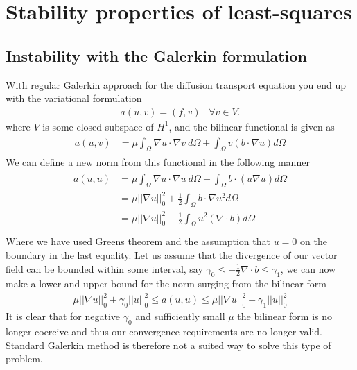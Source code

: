 
\chapter{Stability properties of least-squares} %

\label{chap:newTheory} %


\section{Instability with the Galerkin formulation}

With regular Galerkin approach for the diffusion transport equation you end up with the variational formulation 
%
\begin{align}
	a(u,v) = (f,v) \; \; \; \forall v \in V.
	\label{eq:varFormDiffFEM}
\end{align}
%
where $V$ is some closed subspace of $H^1$, and the bilinear functional is given as 
%
\begin{align}
	\begin{split}
	a(u,v) &= \mu\int_{\Omega}\nabla u \cdot \nabla v \: d\Omega 
	+ \int_{\Omega} v (b \cdot \nabla u) d \Omega
	\end{split}
	\label{eq:bilinearFunctional}
\end{align}
%
We can define a new norm from this functional in the following manner
%
\begin{align}
\begin{split}
	a(u,u) &= \mu\int_{\Omega}\nabla u \cdot \nabla u \: d\Omega 
	+ \int_{\Omega}  b \cdot (u\nabla u) d \Omega\\
	       &= \mu||\nabla u||^2_0 
	+ \frac{1}{2}\int_{\Omega} b \cdot \nabla u^2 d \Omega \\
	       &= \mu||\nabla u||^2_0 
	- \frac{1}{2}\int_{\Omega} u^2  (\nabla \cdot b)  d \Omega \\
\end{split}
	\label{eq:bilinearFunctional}
\end{align}
%
Where we have used Greens theorem and the assumption that $u=0$ on the boundary in the last equality. Let us assume that the divergence of our vector field can be bounded within some interval, say  $\gamma_0 \leq -\frac{1}{2}\nabla \cdot b \leq \gamma_1 $, we can now make a lower and upper bound for the norm surging from the bilinear form 
%
\begin{align}
	\mu||\nabla u||^2_0 + \gamma_0||u||^2_0 \leq a(u,u) \leq \mu||\nabla u||^2_0 + \gamma_1||u||^2_0
	\label{eq:bilinearOperatorBounds}
\end{align}
%
It is clear that for negative $\gamma_0$ and sufficiently small $\mu$ the bilinear form is no longer coercive and thus our convergence requirements are no longer valid. Standard Galerkin method is therefore not a suited way to solve this type of problem. 
